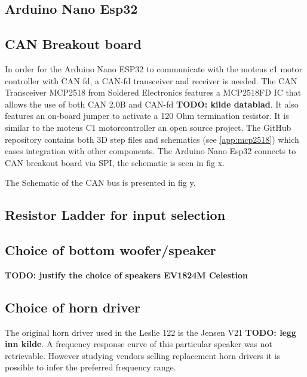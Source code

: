 \subsection{Arduino Nano Esp32}

\subsection{CAN Breakout board}
In order for the Arduino Nano ESP32 to communicate with the moteus c1 motor controller with CAN fd, a CAN-fd transceiver and receiver is needed. The CAN Transceiver MCP2518 from Soldered Electronics features a MCP2518FD IC that allows the use of both CAN 2.0B and CAN-fd \textbf{TODO: kilde datablad}. It also features an on-board jumper to activate a 120 Ohm termination resistor. It is similar to the moteus C1 motorcontroller an open source project. The GitHub repository contains both 3D step files and schematics (see \autoref{app:mcp2518}) which eases integration with other components. The Arduino Nano Esp32 connects to CAN breakout board via SPI, the schematic is seen in fig x.

\begin{figure}
	\begin{center}
		
	\end{center}
	\caption{}\label{fig:arduino-nano-can-breakout}
\end{figure}


The Schematic of the CAN bus is presented in fig y.
\citep{soldered_mcp2518_overview}

\subsection{Resistor Ladder for input selection}


\subsection{Choice of bottom woofer/speaker}
\textbf{TODO: justify the choice of speakers EV1824M Celestion}

\subsection{Choice of horn driver}
The original horn driver used in the Leslie 122 is the Jensen V21 \textbf{TODO: legg inn kilde}. A frequency response curve of this particular
speaker was not retrievable. However studying vendors selling replacement horn drivers it is possible to infer the preferred frequency
range.

